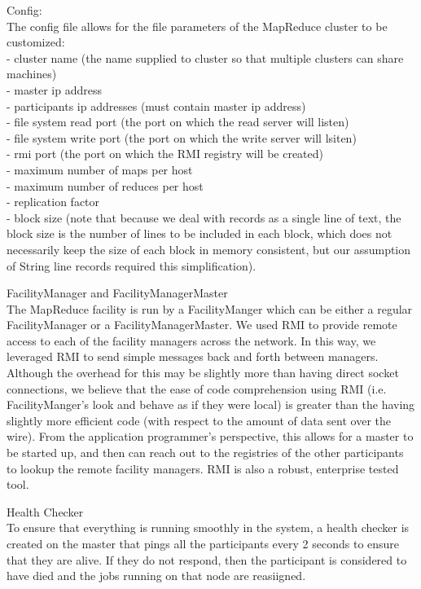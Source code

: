 \documentclass[11pt]{article}
\begin{document}
Config:
\\ The config file allows for the file parameters of the MapReduce cluster to be customized:
\\ - cluster name (the name supplied to cluster so that multiple clusters can share machines)
\\ - master ip address
\\ - participants ip addresses (must contain master ip address)
\\ - file system read port (the port on which the read server will listen)
\\ - file system write port (the port on which the write server will lsiten)
\\ - rmi port (the port on which the RMI registry will be created)
\\ - maximum number of maps per host 
\\ - maximum number of reduces per host 
\\ - replication factor
\\ - block size (note that because we deal with records as a single line of text, the block size is the number of lines to be included in each block, which does not necessarily keep the size of each block in memory consistent, but our assumption of String line records required this simplification).

FacilityManager and FacilityManagerMaster
\\The MapReduce facility is run by a FacilityManger which can be either a regular FacilityManager or a FacilityManagerMaster. We used RMI to provide remote access to each of the facility managers across the network. In this way, we leveraged RMI to send simple messages back and forth between managers. Although the overhead for this may be slightly more than having direct socket connections, we believe that the ease of code comprehension using RMI (i.e. FacilityManger's look and behave as if they were local) is greater than the having slightly more efficient code (with respect to the amount of data sent over the wire). From the application programmer's perspective, this allows for a master to be started up, and then can reach out to the registries of the other participants to lookup the remote facility managers. RMI is also a robust, enterprise tested tool.

Health Checker
\\ To ensure that everything is running smoothly in the system, a health checker is created on the master that pings all the participants every 2 seconds to ensure that they are alive. If they do not respond, then the participant is considered to have died and the jobs running on that node are reasiigned. 
\end{document}
